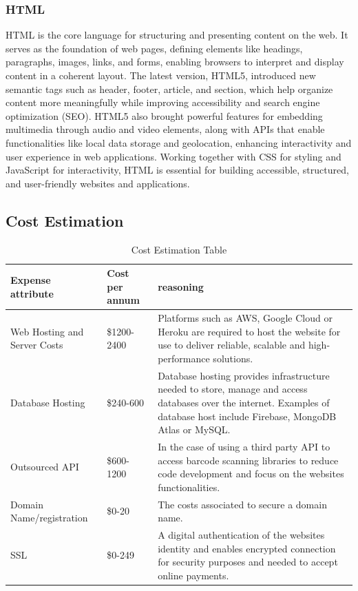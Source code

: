 \documentclass[conference]{IEEEtran}
\begin{document}
\subsubsection{HTML}
HTML is the core language for structuring and presenting content on the web. It serves as the foundation of web pages, defining elements like headings, paragraphs, images, links, and forms, enabling browsers to interpret and display content in a coherent layout. The latest version, HTML5, introduced new semantic tags such as header, footer, article, and section, which help organize content more meaningfully while improving accessibility and search engine optimization (SEO). HTML5 also brought powerful features for embedding multimedia through audio and video elements, along with APIs that enable functionalities like local data storage and geolocation, enhancing interactivity and user experience in web applications. Working together with CSS for styling and JavaScript for interactivity, HTML is essential for building accessible, structured, and user-friendly websites and applications. 

\subsection{Cost Estimation}
\begin{table}[H]
    \centering
    \caption{Cost Estimation Table}
    \begin{adjustbox}{max width=\textwidth}
        \begin{tabular}{|>{\centering\arraybackslash}m{1.8cm}|>{\centering\arraybackslash}m{1.2cm}|m{4.6cm}|}
            \hline
            \textbf{ Expense attribute } & \textbf{ Cost per annum } & \textbf{ reasoning } \\
            \hline
           Web Hosting and Server Costs  & \$1200-2400  & Platforms such as AWS, Google Cloud or Heroku are required to host the website for use to deliver reliable, scalable and high-performance solutions.  \\
            \hline
            Database Hosting  & \$240-600  & Database hosting provides infrastructure needed to store, manage and access databases over the internet. Examples of database host include Firebase, MongoDB Atlas or MySQL.  \\
            \hline
            Outsourced API  & \$600-1200  & In the case of using a third party API to access barcode scanning libraries to reduce code development and focus on the websites functionalities.  \\
            \hline
            Domain Name/registration  & \$0-20  & The costs associated to secure a domain name.   \\
            \hline
            SSL  & \$0-249  & A digital authentication of the websites identity and enables encrypted connection for security purposes and needed to accept online payments.   \\
            \hline
        \end{tabular}
    \end{adjustbox}
\end{table}
\end{document}
